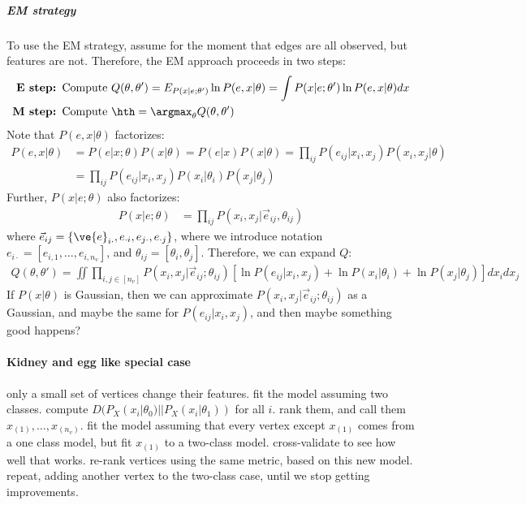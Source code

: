 \subparagraph{EM strategy}

To use the EM strategy, assume for the moment that edges are all observed, but features are not.  Therefore, the EM approach proceeds in two steps:
\begin{align*}
\textbf{E step: } \text{Compute } & Q(\theta,\theta') = E_{P(x | e; \theta')} \ln P(e,x | \theta) = \int P(x | e; \theta') \ln P(e,x | \theta) dx\\
\textbf{M step: } \text{Compute }& \hth = \argmax_{\theta} Q(\theta,\theta')
\end{align*}
Note that $P(e,x|\theta)$ factorizes:
\begin{align}
	P(e,x|\theta) &= P(e | x; \theta) P(x | \theta) = P(e|x) P(x|\theta) = \prod_{ij} P(e_{ij} | x_i,x_j) P(x_i, x_j | \theta) \nonumber \\ 
	&=  \prod_{ij} P(e_{ij} | x_i,x_j) P(x_i| \theta_i) P(x_j | \theta_j)
\end{align}
Further, $P(x|e;\theta)$ also factorizes:
\begin{align}
	P(x|e;\theta) &= \prod_{ij} P(x_i, x_j | \vec{e}_{ij}, \theta_{ij} )
\end{align}
where $\vec{e}_{ij}=\{\ve{e}_{i\cdot}, e_{\cdot i}, e_{j\cdot}, e_{\cdot j}\}$, where we introduce notation $e_{i\cdot}=[e_{i,1}, \ldots, e_{i,n_v}]$, and $\theta_{ij}=[\theta_i,\theta_j]$.  Therefore, we can expand $Q$:
\begin{align}
	Q(\theta,\theta') = \iint \prod_{i,j \in [n_v]} P(x_i,x_j | \vec{e}_{ij}; \theta_{ij}) [\ln P(e_{ij}| x_i, x_j) + \ln P(x_i | \theta_i) + \ln P(x_j | \theta_j)] dx_i dx_j
\end{align}
If $P(x|\theta)$ is Gaussian, then we can approximate $P(x_i,x_j | \vec{e}_{ij}; \theta_{ij})$ as a Gaussian, and maybe the same for $P(e_{ij} | x_i,x_j)$, and then maybe something good happens?



\paragraph{Kidney and egg like special case}

only a small set of vertices change their features.  fit the model assuming two classes.  compute  $D(P_X(x_i | \theta_0) || P_X(x_i | \theta_1))$ for all $i$.  rank them, and call them $x_{(1)}, \ldots, x_{(n_v)}$.  fit the model assuming that every vertex except $x_{(1)}$ comes from a one class model, but fit $x_{(1)}$ to a two-class model.  cross-validate to see how well that works.  re-rank vertices using the same metric, based on this new model.  repeat, adding another vertex to the two-class case, until we stop getting improvements.


